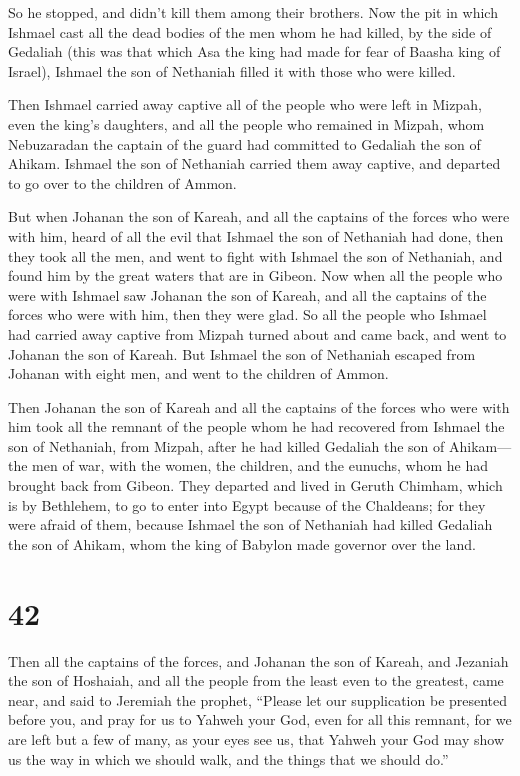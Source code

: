 So he stopped, and didn't kill them among their brothers. 
Now the pit in which Ishmael cast all the dead bodies of the men whom he
had killed, by the side of Gedaliah (this was that which Asa the king
had made for fear of Baasha king of Israel), Ishmael the son of
Nethaniah filled it with those who were killed.

 Then Ishmael carried away captive all of the people who
were left in Mizpah, even the king's daughters, and all the people who
remained in Mizpah, whom Nebuzaradan the captain of the guard had
committed to Gedaliah the son of Ahikam. Ishmael the son of Nethaniah
carried them away captive, and departed to go over to the children of
Ammon.

 But when Johanan the son of Kareah, and all the captains
of the forces who were with him, heard of all the evil that Ishmael the
son of Nethaniah had done,  then they took all the men,
and went to fight with Ishmael the son of Nethaniah, and found him by
the great waters that are in Gibeon.  Now when all the
people who were with Ishmael saw Johanan the son of Kareah, and all the
captains of the forces who were with him, then they were glad.
 So all the people who Ishmael had carried away captive
from Mizpah turned about and came back, and went to Johanan the son of
Kareah.  But Ishmael the son of Nethaniah escaped from
Johanan with eight men, and went to the children of Ammon.

 Then Johanan the son of Kareah and all the captains of
the forces who were with him took all the remnant of the people whom he
had recovered from Ishmael the son of Nethaniah, from Mizpah, after he
had killed Gedaliah the son of Ahikam---the men of war, with the women,
the children, and the eunuchs, whom he had brought back from Gibeon.
 They departed and lived in Geruth Chimham, which is by
Bethlehem, to go to enter into Egypt  because of the
Chaldeans; for they were afraid of them, because Ishmael the son of
Nethaniah had killed Gedaliah the son of Ahikam, whom the king of
Babylon made governor over the land.

\hypertarget{section-41}{%
\section{42}\label{section-41}}

 Then all the captains of the forces, and Johanan the son
of Kareah, and Jezaniah the son of Hoshaiah, and all the people from the
least even to the greatest, came near,  and said to
Jeremiah the prophet, ``Please let our supplication be presented before
you, and pray for us to Yahweh your God, even for all this remnant, for
we are left but a few of many, as your eyes see us,  that
Yahweh your God may show us the way in which we should walk, and the
things that we should do.''

